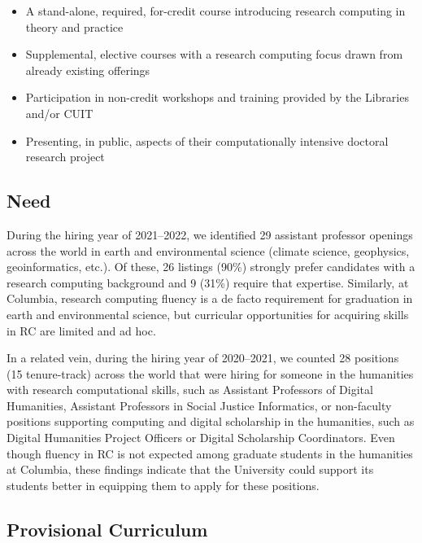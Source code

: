 \documentclass[%
  ,
  article,
  ,
  oneside
  ]{memoir}
\begin{document}
\begin{itemize}
\tightlist
\item
  A stand-alone, required, for-credit course introducing research
  computing in theory and practice
\item
  Supplemental, elective courses with a research computing focus drawn
  from already existing offerings
\item
  Participation in non-credit workshops and training provided by the
  Libraries and/or CUIT
\item
  Presenting, in public, aspects of their computationally intensive
  doctoral research project
\end{itemize}

\hypertarget{need}{%
\subsection{Need}\label{need}}

During the hiring year of 2021--2022, we identified 29 assistant
professor openings across the world in earth and environmental science
(climate science, geophysics, geoinformatics, etc.). Of these, 26
listings (90\%) strongly prefer candidates with a research computing
background and 9 (31\%) require that expertise. Similarly, at Columbia,
research computing fluency is a de facto requirement for graduation in
earth and environmental science, but curricular opportunities for
acquiring skills in RC are limited and ad hoc.

In a related vein, during the hiring year of 2020--2021, we counted 28
positions (15 tenure-track) across the world that were hiring for
someone in the humanities with research computational skills, such as
Assistant Professors of Digital Humanities, Assistant Professors in
Social Justice Informatics, or non-faculty positions supporting
computing and digital scholarship in the humanities, such as Digital
Humanities Project Officers or Digital Scholarship Coordinators. Even
though fluency in RC is not expected among graduate students in the
humanities at Columbia, these findings indicate that the University
could support its students better in equipping them to apply for these
positions.

\hypertarget{provisional-curriculum}{%
\subsection{Provisional Curriculum}\label{provisional-curriculum}}
\end{document}
